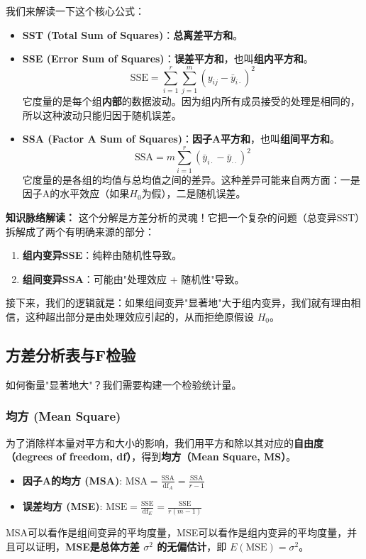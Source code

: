 \documentclass[12pt, a4paper]{amsart}
\begin{document}
    

我们来解读一下这个核心公式：
\begin{itemize}
    \item \textbf{SST (Total Sum of Squares)}：\textbf{总离差平方和}。
    \item \textbf{SSE (Error Sum of Squares)}：\textbf{误差平方和}，也叫\textbf{组内平方和}。
        $$ \text{SSE} = \sum_{i=1}^{r} \sum_{j=1}^{m} (y_{ij} - \bar{y}_{i\cdot})^2 $$
        它度量的是每个组\textbf{内部}的数据波动。因为组内所有成员接受的处理是相同的，所以这种波动只能归因于随机误差。
    \item \textbf{SSA (Factor A Sum of Squares)}：\textbf{因子A平方和}，也叫\textbf{组间平方和}。
        $$ \text{SSA} = m \sum_{i=1}^{r} (\bar{y}_{i\cdot} - \bar{y}_{\cdot\cdot})^2 $$
        它度量的是各组的均值与总均值之间的差异。这种差异可能来自两方面：一是因子A的水平效应（如果$H_0$为假），二是随机误差。
\end{itemize}

\textbf{知识脉络解读：}
这个分解是方差分析的灵魂！它把一个复杂的问题（总变异SST）拆解成了两个有明确来源的部分：
\begin{enumerate}
    \item \textbf{组内变异SSE}：纯粹由随机性导致。
    \item \textbf{组间变异SSA}：可能由"处理效应 + 随机性"导致。
\end{enumerate}
接下来，我们的逻辑就是：如果组间变异"显著地"大于组内变异，我们就有理由相信，这种超出部分是由处理效应引起的，从而拒绝原假设 $H_0$。

\subsection{方差分析表与F检验}
如何衡量"显著地大"？我们需要构建一个检验统计量。

\subsubsection{均方 (Mean Square)}
为了消除样本量对平方和大小的影响，我们用平方和除以其对应的\textbf{自由度（degrees of freedom, df）}，得到\textbf{均方（Mean Square, MS）}。
\begin{itemize}
    \item \textbf{因子A的均方 (MSA)}: $ \text{MSA} = \frac{\text{SSA}}{\text{df}_A} = \frac{\text{SSA}}{r-1} $
    \item \textbf{误差均方 (MSE)}: $ \text{MSE} = \frac{\text{SSE}}{\text{df}_E} = \frac{\text{SSE}}{r(m-1)} $
\end{itemize}
MSA可以看作是组间变异的平均度量，MSE可以看作是组内变异的平均度量，并且可以证明，\textbf{MSE是总体方差 $\sigma^2$ 的无偏估计}，即 $E(\text{MSE}) = \sigma^2$。
\end{document}
